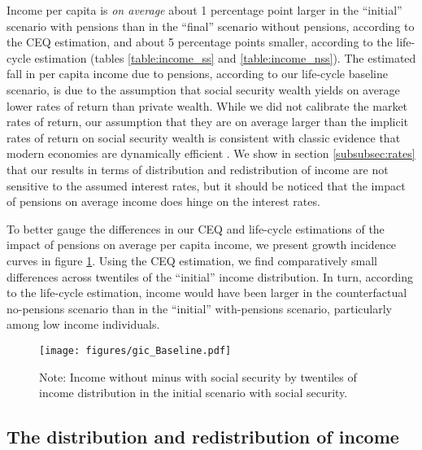 \documentclass{article}
\newcommand\fnote[1]{\captionsetup{width=.6\linewidth, font=small}\caption*{#1}}
\newcommand{\Figtext}[1]{%
	\begin{tablenotes}[para,online, flushleft]
		\footnotesize
		\hspace{-0.25cm}
		#1
	\end{tablenotes}
}
\newcommand{\Fignote}[1]{\Figtext{~#1}}
\begin{document}
Income per capita is \textit{on average} about 1 percentage point larger in the ``initial'' scenario with pensions than in the ``final'' scenario without pensions, according to the CEQ estimation, and about 5 percentage points smaller, according to the life-cycle estimation (tables \ref{table:income_ss} and \ref{table:income_nss}). The estimated fall in per capita income due to pensions, according to our life-cycle baseline scenario, is due to the assumption that social security wealth yields on average lower rates of return than private wealth. While we  did not calibrate the market rates of return, our assumption that they are on average larger than the implicit rates of return on social security wealth is consistent with classic evidence that modern economies are dynamically efficient \parencite{Abel1989}. We show in section \ref{subsubsec:rates} that  our results in terms of distribution and redistribution of income are not sensitive to the assumed  interest rates, but it should be noticed that the impact of pensions on average income does hinge on the interest rates. 

To better gauge the differences in our CEQ and life-cycle estimations of the impact of pensions on average per capita income, we present growth incidence curves in figure \ref{figure:gic}. Using  the CEQ estimation, we find comparatively small differences across twentiles of the ``initial'' income distribution. In turn, according to the life-cycle estimation, income would have been larger in the counterfactual no-pensions scenario than in the ``initial'' with-pensions scenario, particularly among low income individuals. 



\begin{figure} 
    \centering
    \caption{Growth incidence curves}
\texttt{[image: figures/gic\_Baseline.pdf]}  

\fnote{Note: Income without minus with social security by twentiles of income distribution in the initial scenario with social security.}
\label{figure:gic}
\end{figure}

\subsection{The distribution and redistribution of income} \label{subsec:dineq}
 
\end{document}
